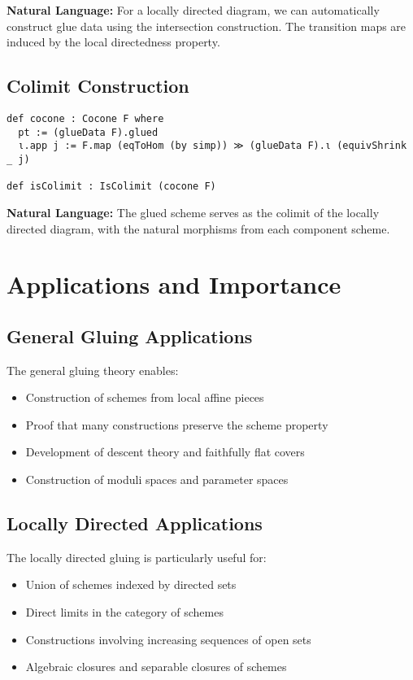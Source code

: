 \documentclass{article}
\theoremstyle{definition}
\begin{document}
\textbf{Natural Language:} For a locally directed diagram, we can automatically construct glue data using the intersection construction. The transition maps are induced by the local directedness property.

\subsection{Colimit Construction}

\begin{lstlisting}
def cocone : Cocone F where
  pt := (glueData F).glued
  ι.app j := F.map (eqToHom (by simp)) ≫ (glueData F).ι (equivShrink _ j)

def isColimit : IsColimit (cocone F)
\end{lstlisting}

\textbf{Natural Language:} The glued scheme serves as the colimit of the locally directed diagram, with the natural morphisms from each component scheme.

\section{Applications and Importance}

\subsection{General Gluing Applications}

The general gluing theory enables:
\begin{itemize}
\item Construction of schemes from local affine pieces
\item Proof that many constructions preserve the scheme property
\item Development of descent theory and faithfully flat covers
\item Construction of moduli spaces and parameter spaces
\end{itemize}

\subsection{Locally Directed Applications}

The locally directed gluing is particularly useful for:
\begin{itemize}
\item Union of schemes indexed by directed sets
\item Direct limits in the category of schemes
\item Constructions involving increasing sequences of open sets
\item Algebraic closures and separable closures of schemes
\end{itemize}
\end{document}
